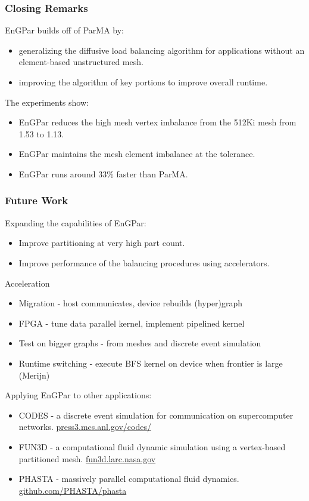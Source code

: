 \documentclass{beamer}
\begin{document}
\begin{frame}
  \frametitle{Closing Remarks}
  EnGPar builds off of ParMA by:
  \begin {itemize}
  \item generalizing the diffusive load balancing algorithm for applications without an element-based unstructured mesh.
  \item improving the algorithm of key portions to improve overall runtime.
  \end{itemize}
  The experiments show:
  \begin {itemize}
  \item EnGPar reduces the high mesh vertex imbalance from the 512Ki mesh from 1.53 to 1.13.
  \item EnGPar maintains the mesh element imbalance at the tolerance.
  \item EnGPar runs around 33\% faster than ParMA.
  \end{itemize}
\end{frame}

\begin{frame}
  \frametitle{Future Work}
  Expanding the capabilities of EnGPar:
  \begin{itemize}
    \item Improve partitioning at very high part count.
    \item Improve performance of the balancing procedures using accelerators.
  \end{itemize}
  Acceleration
  \begin{itemize}
    \item Migration - host communicates, device rebuilds (hyper)graph
    \item FPGA - tune data parallel kernel, implement pipelined kernel
    \item Test on bigger graphs - from meshes and discrete event simulation
    \item Runtime switching - execute BFS kernel on device when frontier is large (Merijn)
  \end{itemize}
  Applying EnGPar to other applications:
  \begin{itemize}
    \item CODES - a discrete event simulation for communication on supercomputer networks. \url{press3.mcs.anl.gov/codes/}
    \item FUN3D - a computational fluid dynamic simulation using a vertex-based partitioned mesh. \url{fun3d.larc.nasa.gov}
    \item PHASTA - massively parallel computational fluid dynamics. \url{github.com/PHASTA/phasta}
  \end{itemize}
\end{frame}
\end{document}
